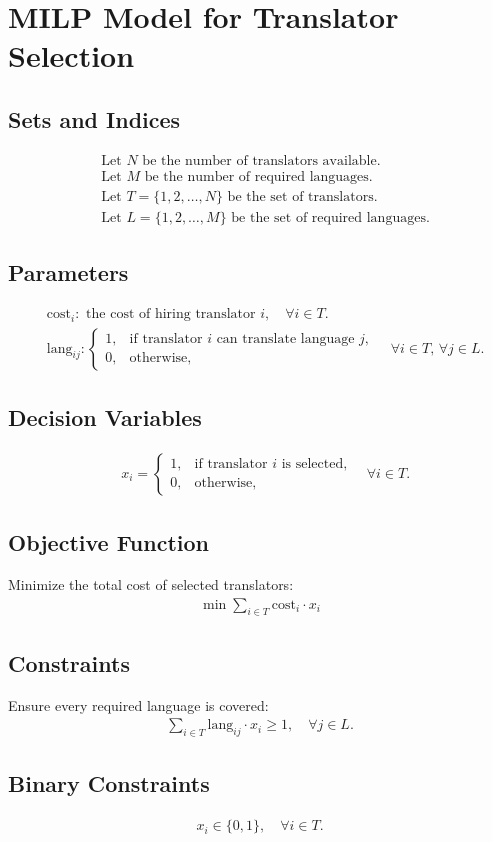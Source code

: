 \documentclass{article}
\begin{document}
\section*{MILP Model for Translator Selection}

\subsection*{Sets and Indices}
\begin{align*}
& \text{Let } N \text{ be the number of translators available.} \\
& \text{Let } M \text{ be the number of required languages.} \\
& \text{Let } T = \{1, 2, \ldots, N\} \text{ be the set of translators.} \\
& \text{Let } L = \{1, 2, \ldots, M\} \text{ be the set of required languages.}
\end{align*}

\subsection*{Parameters}
\begin{align*}
& \text{cost}_i: \text{ the cost of hiring translator } i, \quad \forall i \in T. \\
& \text{lang}_{ij}: 
  \begin{cases} 
  1, & \text{if translator } i \text{ can translate language } j, \\
  0, & \text{otherwise,} 
  \end{cases} 
  \quad \forall i \in T, \, \forall j \in L.
\end{align*}

\subsection*{Decision Variables}
\begin{align*}
& x_i = 
  \begin{cases} 
  1, & \text{if translator } i \text{ is selected,} \\
  0, & \text{otherwise,}
  \end{cases} 
  \quad \forall i \in T. 
\end{align*}

\subsection*{Objective Function}
Minimize the total cost of selected translators:
\begin{align*}
\min \sum_{i \in T} \text{cost}_i \cdot x_i
\end{align*}

\subsection*{Constraints}
Ensure every required language is covered:
\begin{align*}
\sum_{i \in T} \text{lang}_{ij} \cdot x_i \geq 1, \quad \forall j \in L.
\end{align*}

\subsection*{Binary Constraints}
\begin{align*}
x_i \in \{0, 1\}, \quad \forall i \in T.
\end{align*}
\end{document}

